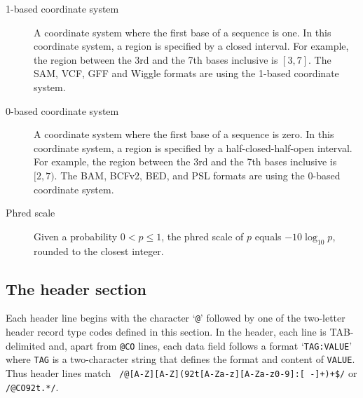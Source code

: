 \documentclass[10pt]{article}
\begin{document}
\begin{description}
\item[1-based coordinate system] A coordinate system where the first
  base of a sequence is one. In this coordinate system, a region is
  specified by a closed interval. For example, the region between the
  3rd and the 7th bases inclusive is $[3,7]$. The SAM, VCF, GFF and Wiggle
  formats are using the 1-based coordinate system.

\item[0-based coordinate system] A coordinate system where the first
  base of a sequence is zero. In this coordinate system, a region is
  specified by a half-closed-half-open interval. For example, the region
  between the 3rd and the 7th bases inclusive is $[2,7)$. The BAM, BCFv2, BED,
  and PSL formats are using the 0-based coordinate system.

\item[Phred scale] Given a probability $0<p\le 1$, the phred scale of $p$
  equals $-10\log_{10}p$, rounded to the closest integer.

\end{description}


\subsection{The header section}
Each header line begins with the character `{\tt @}' followed by
one of the two-letter header record type codes defined in this section.
In the header, each line is TAB-delimited and, apart from {\tt @CO} lines,
each data field follows a format `{\tt TAG:VALUE}' where {\tt TAG}
is a two-character string that defines the format and content of {\tt VALUE}.
Thus header lines match {\tt
  /@[A-Z][A-Z](\char92t[A-Za-z][A-Za-z0-9]:[
  -]+)+\$/} or {\tt /@CO\char92t.*/}.
\end{document}
